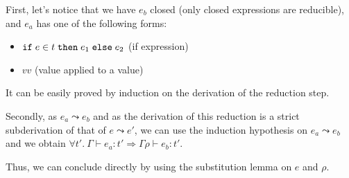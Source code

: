 \documentclass[a4paper]{article}
\theoremstyle{definition}
\begin{document}
\begin{description}
\begin{itemize}
            First, let's notice that we have $e_b$ closed (only closed expressions are reducible),
            and $e_a$ has one of the following forms:
            \begin{itemize}
              \item $\texttt{if}\;e\in t\;\texttt{then}\;e_1\;\texttt{else}\;e_2$ (if expression)
              \item $v v$ (value applied to a value)
            \end{itemize}
            It can be easily proved by induction on the derivation of the reduction step.

            Secondly, as $e_a\leadsto e_b$ and as the derivation of this reduction is a strict subderivation of that of $e\leadsto e'$,
            we can use the induction hypothesis on $e_a\leadsto e_b$ and we obtain $\forall t'.\ \Gamma \vdash e_a : t' \Rightarrow \Gamma\rho \vdash e_b:t'$.
            
            Thus, we can conclude directly by using the substitution lemma on $e$ and $\rho$.
          \end{itemize}
        \end{description}
\end{document}
